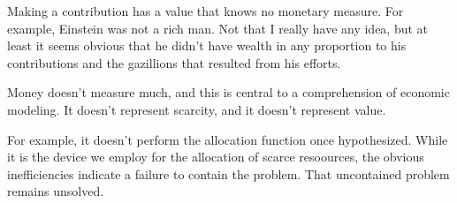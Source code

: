 

Making a contribution has a value that knows no monetary measure.  For
example, Einstein was not a rich man.  Not that I really have any
idea, but at least it seems obvious that he didn't have wealth in any
proportion to his contributions and the gazillions that resulted from
his efforts.

Money doesn't measure much, and this is central to a comprehension of
economic modeling.  It doesn't represent scarcity, and it doesn't
represent value.  

For example, it doesn't perform the allocation function once
hypothesized.  While it is the device we employ for the allocation of
scarce resoources, the obvious inefficiencies indicate a failure to
contain the problem.  That uncontained problem remains unsolved.

\bye
